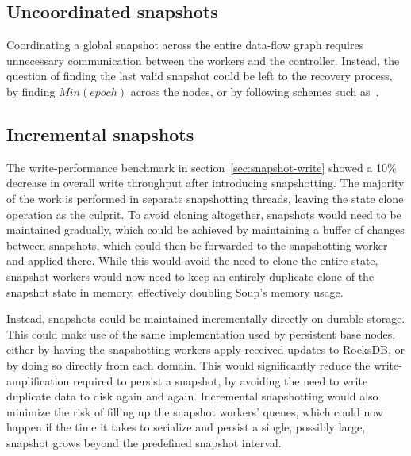 \subsection{Uncoordinated snapshots}

Coordinating a global snapshot across the entire data-flow graph requires
unnecessary communication between the workers and the controller. Instead, the
question of finding the last valid snapshot could be left to the recovery
process, \eg by finding $ Min(epoch) $ across the nodes, or by following schemes
such as~\cite{falkirk}.

\subsection{Incremental snapshots}

The write-performance benchmark in section~\ref{sec:snapshot-write} showed a
10\% decrease in overall write throughput after introducing snapshotting. The
majority of the work is performed in separate snapshotting threads, leaving the
state clone operation as the culprit. To avoid cloning altogether, snapshots
would need to be maintained gradually, which could be achieved by maintaining a
buffer of changes between snapshots, which could then be forwarded to the
snapshotting worker and applied there. While this would avoid the need to clone
the entire state, snapshot workers would now need to keep an entirely duplicate
clone of the snapshot state in memory, effectively doubling Soup's memory usage.

Instead, snapshots could be maintained incrementally directly on durable
storage. This could make use of the same  implementation
used by persistent base nodes, either by having the snapshotting workers apply
received updates to RocksDB, or by doing so directly from each domain. This
would significantly reduce the write-amplification required to persist a
snapshot, by avoiding the need to write duplicate data to disk again and again.
Incremental snapshotting would also minimize the risk of filling up the snapshot
workers' queues, which could now happen if the time it takes to serialize and
persist a single, possibly large, snapshot grows beyond the predefined snapshot
interval.
